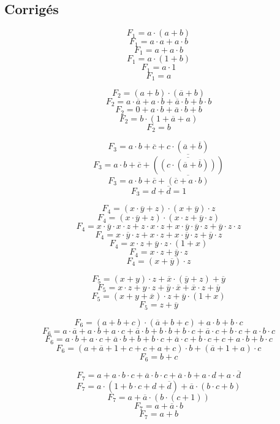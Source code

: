 \documentclass{article}
\begin{document}
\newpage
\subsection*{Corrigés}

\begin{multicols}{2}
\[ F_1 = a \cdot (a + b) \]
\[ F_1 = a \cdot a + a \cdot b \]
\[ F_1 = a + a \cdot b \]
\[ F_1 = a \cdot (1 + b) \]
\[ F_1 = a \cdot 1 \]
\[ F_1 = a \]


\[ F_2 = (a + b) \cdot (\overline{a} + b) \]
\[ F_2 = a \cdot \overline{a} + a \cdot b + \overline{a} \cdot b + b \cdot b \]
\[ F_2 = 0 + a \cdot b + \overline{a} \cdot b + b \]
\[ F_2 = b \cdot (1 + \overline{a} + a) \]
\[ F_2 = b \]


\[ F_3 = a \cdot b + \overline{c} + c \cdot (\overline{a} + \overline{b}) \]
\[ F_3 = a \cdot b + \overline{c} + \overline{(\overline{(c \cdot (\overline{a} + \overline{b}))})} \]
\[ F_3 = a \cdot b + \overline{c} + \overline{(\overline{c} + a \cdot b)} \]
\[ F_3 = d + \overline{d} = 1 \]

\[ F_4 = (x \cdot \overline{y} + z) \cdot (x + \overline{y}) \cdot z \]
\[ F_4 = (x \cdot \overline{y}+ z) \cdot (x \cdot z + \overline{y} \cdot z) \]
\[ F_4 = x \cdot \overline{y} \cdot x \cdot z + z \cdot x \cdot z + x \cdot \overline{y} \cdot \overline{y} \cdot z + \overline{y} \cdot z \cdot z \]
\[ F_4 = x \cdot \overline{y} \cdot z + x \cdot z + x \cdot \overline{y} \cdot z + \overline{y} \cdot z \]
\[ F_4 = x \cdot z + \overline{y} \cdot z \cdot (1 + x) \]
\[ F_4 = x \cdot z + \overline{y} \cdot z \]
\[ F_4 = (x + \overline{y}) \cdot z \]


\[ F_5 = (x + y) \cdot z + \overline{x} \cdot (\overline{y} + z) + \overline{y} \]
\[ F_5 = x \cdot z + y \cdot z + \overline{y} \cdot \overline{x} + \overline{x} \cdot z + \overline{y} \]
\[ F_5 = (x + y + \overline{x}) \cdot z + \overline{y} \cdot (1 + x) \]
\[ F_5 = z + \overline{y} \]


\[ F_6 = (a + b + c) \cdot (\overline{a} + b + c) + a \cdot b + b \cdot c \]
\[ F_6 = a \cdot \overline{a} + a \cdot b + a \cdot c + \overline{a} \cdot b + b \cdot b + b \cdot c + \overline{a} \cdot c + b \cdot c + a \cdot b \cdot c \]
\[ F_6 = a \cdot b + a \cdot c + \overline{a}\cdot b +b +b\cdot c + \overline{a} \cdot c + b \cdot c +c + a \cdot b + b\cdot c \]
\[ F_6 = (a + \overline{a} + 1 + c + c + a + c ) \cdot b + (\overline{a} + 1 + a) \cdot c \]
\[ F_6 = b + c \]


\[ F_7 = a + a \cdot b \cdot c + \overline{a} \cdot b \cdot c + \overline{a} \cdot b + a \cdot d + a \cdot \overline{d} \]
\[ F_7 = a \cdot (1 + b \cdot c + d + \overline{d}) + \overline{a} \cdot (b \cdot c + b) \]
\[ F_7 = a + \overline{a} \cdot (b \cdot (c + 1)) \]
\[ F_7 = a + \overline{a} \cdot b \]
\[ F_7 = a + b \]



\end{multicols}
\end{document}
